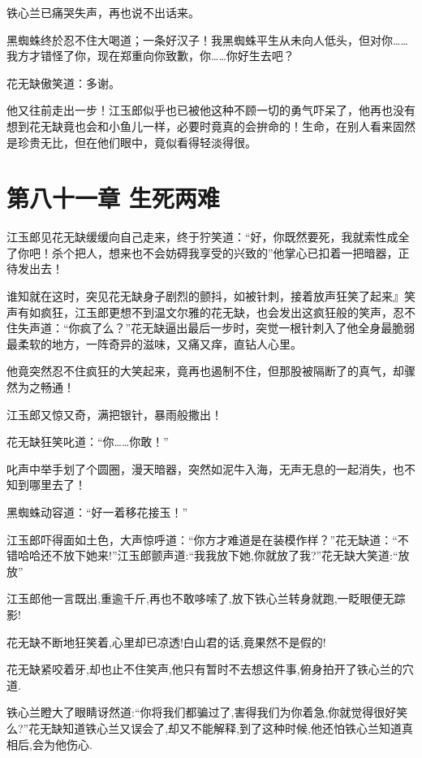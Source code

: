 \documentclass[12pt,oneside]{book}
\begin{document}
铁心兰已痛哭失声，再也说不出话来。

黑蜘蛛终於忍不住大喝道；一条好汉子！我黑蜘蛛平生从未向人低头，但对你\ldots\ldots 我方才错怪了你，现在郑重向你致歉，你\ldots\ldots 你好生去吧？

花无缺傲笑道：多谢。

他又往前走出一步！江玉郎似乎也已被他这种不顾一切的勇气吓呆了，他再也没有想到花无缺竟也会和小鱼儿一样，必要时竟真的会拚命的！生命，在别人看来固然是珍贵无比，但在他们眼中，竟似看得轻淡得很。

\hypertarget{ux7b2cux516bux5341ux4e00ux7ae0-ux751fux6b7bux4e24ux96be}{%
\chapter{第八十一章
生死两难}\label{ux7b2cux516bux5341ux4e00ux7ae0-ux751fux6b7bux4e24ux96be}}

江玉郎见花无缺缓缓向自己走来，终于狞笑道：``好，你既然要死，我就索性成全了你吧！杀个把人，想来也不会妨碍我享受的兴致的''他掌心已扣着一把暗器，正待发出去！

谁知就在这时，突见花无缺身子剧烈的颤抖，如被针刺，接着放声狂笑了起来』笑声有如疯狂，江玉郎更想不到温文尔雅的花无缺，也会发出这疯狂般的笑声，忍不住失声道：``你疯了么？''花无缺逼出最后一步时，突觉一根针刺入了他全身最脆弱最柔软的地方，一阵奇异的滋味，又痛又痒，直钻人心里。

他竟突然忍不住疯狂的大笑起来，竟再也遏制不住，但那股被隔断了的真气，却骤然为之畅通！

江玉郎又惊又奇，满把银针，暴雨般撒出！

花无缺狂笑叱道：``你\ldots\ldots 你敢！''

叱声中举手划了个圆圈，漫天暗器，突然如泥牛入海，无声无息的一起消失，也不知到哪里去了！

黑蜘蛛动容道：``好一着移花接玉！''

江玉郎吓得面如土色，大声惊呼道：``你方才难道是在装模作样？''花无缺道：``不错哈哈还不放下她来!''江玉郎颤声道:``我我放下她,你就放了我?''花无缺大笑道:``放放''

江玉郎他一言既出,重逾千斤,再也不敢哆嗦了,放下铁心兰转身就跑,一眨眼便无踪影!

花无缺不断地狂笑着,心里却已凉透!白山君的话,竟果然不是假的!

花无缺紧咬着牙,却也止不住笑声,他只有暂时不去想这件事,俯身拍开了铁心兰的穴道.

铁心兰瞪大了眼睛讶然道:``你将我们都骗过了,害得我们为你着急,你就觉得很好笑么?''花无缺知道铁心兰又误会了,却又不能解释,到了这种时候,他还怕铁心兰知道真相后,会为他伤心.
\end{document}
